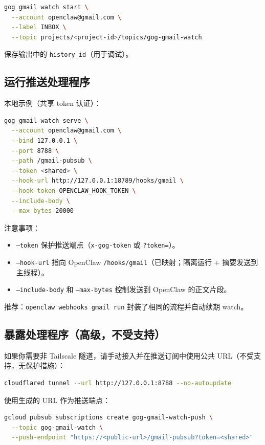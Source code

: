\begin{lstlisting}[language=bash]
gog gmail watch start \
  --account openclaw@gmail.com \
  --label INBOX \
  --topic projects/<project-id>/topics/gog-gmail-watch
\end{lstlisting}


保存输出中的 \texttt{history\_id}（用于调试）。

\subsection{运行推送处理程序}


本地示例（共享 token 认证）：

\begin{lstlisting}[language=bash]
gog gmail watch serve \
  --account openclaw@gmail.com \
  --bind 127.0.0.1 \
  --port 8788 \
  --path /gmail-pubsub \
  --token <shared> \
  --hook-url http://127.0.0.1:18789/hooks/gmail \
  --hook-token OPENCLAW_HOOK_TOKEN \
  --include-body \
  --max-bytes 20000
\end{lstlisting}


注意事项：

\begin{itemize}
  \item \texttt{--token} 保护推送端点（\texttt{x-gog-token} 或 \texttt{?token=}）。
  \item \texttt{--hook-url} 指向 OpenClaw \texttt{/hooks/gmail}（已映射；隔离运行 + 摘要发送到主线程）。
  \item \texttt{--include-body} 和 \texttt{--max-bytes} 控制发送到 OpenClaw 的正文片段。
\end{itemize}


推荐：\texttt{openclaw webhooks gmail run} 封装了相同的流程并自动续期 watch。

\subsection{暴露处理程序（高级，不受支持）}


如果你需要非 Tailscale 隧道，请手动接入并在推送订阅中使用公共 URL（不受支持，无保护措施）：

\begin{lstlisting}[language=bash]
cloudflared tunnel --url http://127.0.0.1:8788 --no-autoupdate
\end{lstlisting}


使用生成的 URL 作为推送端点：

\begin{lstlisting}[language=bash]
gcloud pubsub subscriptions create gog-gmail-watch-push \
  --topic gog-gmail-watch \
  --push-endpoint "https://<public-url>/gmail-pubsub?token=<shared>"
\end{lstlisting}


